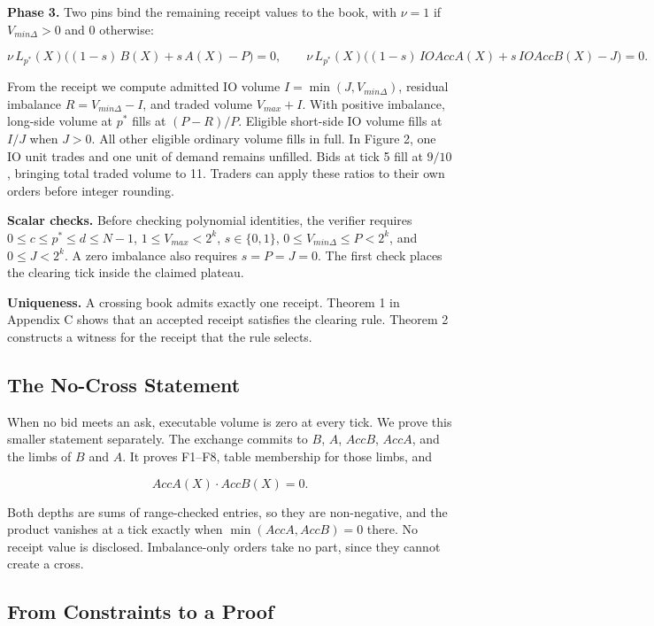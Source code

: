 \textbf{Phase 3.} Two pins bind the remaining receipt values to the book, with \(\nu = 1\) if \(V_{min\Delta} > 0\) and 0 otherwise:

\[\nu\, L_{p^*}(X)\big((1-s)\,B(X) + s\,A(X) - P\big) = 0, \qquad \nu\, L_{p^*}(X)\big((1-s)\,IOAccA(X) + s\,IOAccB(X) - J\big) = 0. \tag{F32, F33}\]

From the receipt we compute admitted IO volume \(I=\min(J,V_{min\Delta})\), residual imbalance \(R=V_{min\Delta}-I\), and traded volume \(V_{max}+I\). With positive imbalance, long-side volume at \(p^*\) fills at \((P-R)/P\). Eligible short-side IO volume fills at \(I/J\) when \(J>0\). All other eligible ordinary volume fills in full. In Figure 2, one IO unit trades and one unit of demand remains unfilled. Bids at tick 5 fill at \(9/10\), bringing total traded volume to 11. Traders can apply these ratios to their own orders before integer rounding.

\textbf{Scalar checks.} Before checking polynomial identities, the verifier requires \(0\le c\le p^*\le d\le N-1\), \(1\le V_{max}<2^k\), \(s\in\{0,1\}\), \(0\le V_{min\Delta}\le P<2^k\), and \(0\le J<2^k\). A zero imbalance also requires \(s=P=J=0\). The first check places the clearing tick inside the claimed plateau.

\textbf{Uniqueness.} A crossing book admits exactly one receipt. Theorem 1 in Appendix C shows that an accepted receipt satisfies the clearing rule. Theorem 2 constructs a witness for the receipt that the rule selects.

\subsection{The No-Cross Statement}

When no bid meets an ask, executable volume is zero at every tick. We prove this smaller statement separately. The exchange commits to \(B\), \(A\), \(AccB\), \(AccA\), and the limbs of \(B\) and \(A\). It proves F1--F8, table membership for those limbs, and

\[AccA(X) \cdot AccB(X) = 0.\]

Both depths are sums of range-checked entries, so they are non-negative, and the product vanishes at a tick exactly when \(\min(AccA, AccB) = 0\) there. No receipt value is disclosed. Imbalance-only orders take no part, since they cannot create a cross.

\subsection{From Constraints to a Proof}

